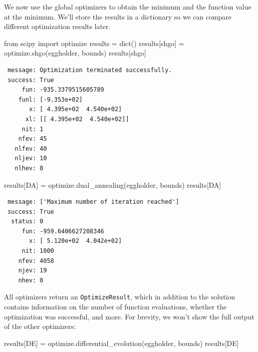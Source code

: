 \documentclass[
  letterpaper,
  DIV=11,
  numbers=noendperiod]{scrreprt}
\newenvironment{Shaded}{\begin{snugshade}}{\end{snugshade}}
\newcommand{\BuiltInTok}[1]{\textcolor[rgb]{0.00,0.23,0.31}{#1}}
\newcommand{\ImportTok}[1]{\textcolor[rgb]{0.00,0.46,0.62}{#1}}
\newcommand{\NormalTok}[1]{\textcolor[rgb]{0.00,0.23,0.31}{#1}}
\newcommand{\OperatorTok}[1]{\textcolor[rgb]{0.37,0.37,0.37}{#1}}
\newcommand{\StringTok}[1]{\textcolor[rgb]{0.13,0.47,0.30}{#1}}
\begin{document}
We now use the global optimizers to obtain the minimum and the function
value at the minimum. We'll store the results in a dictionary so we can
compare different optimization results later.

\begin{Shaded}
\begin{Highlighting}[]
\ImportTok{from}\NormalTok{ scipy }\ImportTok{import}\NormalTok{ optimize}
\NormalTok{results }\OperatorTok{=} \BuiltInTok{dict}\NormalTok{()}
\NormalTok{results[}\StringTok{\textquotesingle{}shgo\textquotesingle{}}\NormalTok{] }\OperatorTok{=}\NormalTok{ optimize.shgo(eggholder, bounds)}
\NormalTok{results[}\StringTok{\textquotesingle{}shgo\textquotesingle{}}\NormalTok{]}
\end{Highlighting}
\end{Shaded}

\begin{verbatim}
 message: Optimization terminated successfully.
 success: True
     fun: -935.3379515605789
    funl: [-9.353e+02]
       x: [ 4.395e+02  4.540e+02]
      xl: [[ 4.395e+02  4.540e+02]]
     nit: 1
    nfev: 45
   nlfev: 40
   nljev: 10
   nlhev: 0
\end{verbatim}

\begin{Shaded}
\begin{Highlighting}[]
\NormalTok{results[}\StringTok{\textquotesingle{}DA\textquotesingle{}}\NormalTok{] }\OperatorTok{=}\NormalTok{ optimize.dual\_annealing(eggholder, bounds)}
\NormalTok{results[}\StringTok{\textquotesingle{}DA\textquotesingle{}}\NormalTok{]}
\end{Highlighting}
\end{Shaded}

\begin{verbatim}
 message: ['Maximum number of iteration reached']
 success: True
  status: 0
     fun: -959.6406627208346
       x: [ 5.120e+02  4.042e+02]
     nit: 1000
    nfev: 4058
    njev: 19
    nhev: 0
\end{verbatim}

All optimizers return an \texttt{OptimizeResult}, which in addition to
the solution contains information on the number of function evaluations,
whether the optimization was successful, and more. For brevity, we won't
show the full output of the other optimizers:

\begin{Shaded}
\begin{Highlighting}[]
\NormalTok{results[}\StringTok{\textquotesingle{}DE\textquotesingle{}}\NormalTok{] }\OperatorTok{=}\NormalTok{ optimize.differential\_evolution(eggholder, bounds)}
\NormalTok{results[}\StringTok{\textquotesingle{}DE\textquotesingle{}}\NormalTok{]}
\end{Highlighting}
\end{Shaded}
\end{document}
